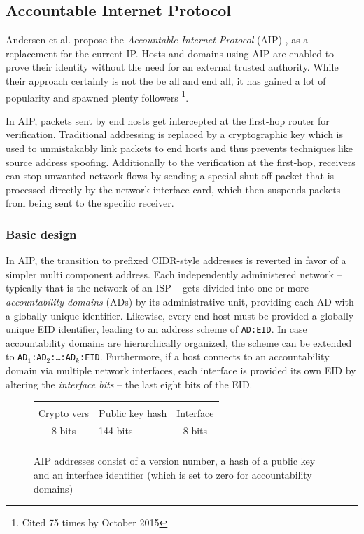 \documentclass{acm_proc_article-sp}
\begin{document}

\subsection{Accountable Internet Protocol}
\label{sec:aip}
Andersen et al. propose the \emph{Accountable Internet Protocol} (AIP) \cite{aip}, as a replacement for the current IP. Hosts and domains using AIP are enabled to prove their identity without the need for an external trusted authority. While their approach certainly is not the be all and end all, it has gained a lot of popularity and spawned plenty followers \footnote{Cited 75 times by October 2015}.

In AIP, packets sent by end hosts get intercepted at the first-hop router for verification. Traditional addressing is replaced by a cryptographic key which is used to unmistakably link packets to end hosts and thus prevents techniques like source address spoofing. Additionally to the verification at the first-hop, receivers can stop unwanted network flows by sending a special shut-off packet that is processed directly by the network interface card, which then suspends packets from being sent to the specific receiver.

\subsubsection{Basic design}
\label{sec:aipbd}

In AIP, the transition to prefixed CIDR-style addresses is reverted in favor of a simpler multi component address. Each independently administered network -- typically that is the network of an ISP -- gets divided into one or more \emph{accountability domains} (ADs) by its administrative unit, providing each AD with a globally unique identifier. Likewise, every end host must be provided a globally unique EID identifier, leading to an address scheme of \texttt{AD:EID}. In case accountability domains are hierarchically organized, the scheme can be extended to \texttt{AD$_1$:AD$_2$:\ldots:AD$_k$:EID}. Furthermore, if a host connects to an accountability domain via multiple network interfaces, each interface is provided its own EID by altering the \emph{interface bits} -- the last eight bits of the EID.

\begin{figure}[h!]
	\label{fig:aipadr}
	\begin{tabularx}{0.47\textwidth}{|c|C|c|}
		\hline & & \\
 		Crypto vers & Public key hash & Interface \\
		8 bits & 144 bits & 8 bits \\ & & \\
		\hline
	\end{tabularx}
	\caption{AIP addresses consist of a version number, a hash of a public key and an interface identifier 		(which is set to zero for accountability domains) \cite{aip}}
\end{figure}
\end{document}
